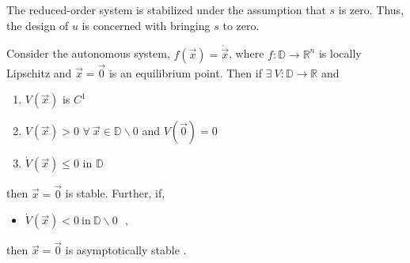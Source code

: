The reduced-order system is stabilized under the assumption that $s$ is zero. Thus, the design of $u$ is concerned with bringing $s$ to zero.
\begin{theorem}
  \label{th:lyapunovStabilityTheorem}
  Consider the autonomous system, $f(\vec{x}) = \dot{\vec{x}}$, where $f : \mathbb{D} \rightarrow \mathbb{R} ^n$ is locally Lipschitz and $\vec{x}=\vec{0}$ is an equilibrium point. Then if $\exists\ V : \mathbb{D} \rightarrow \mathbb{R}$ and \vspace{-12pt}
  \begin{enumerate}
    \item $V(\vec{x})$ is $C^1$
    \item $V(\vec{x}) > 0$ $\forall\ \vec{x} \in \mathbb{D}\backslash 0$ and $V(\vec{0}) = 0$
    \item $\dot{V}(\vec{x}) \leq 0$ in $\mathbb{D}$
  \end{enumerate} \vspace{-12pt}
  then $\vec{x} = \vec{0}$ is stable. Further, if,
  \vspace{-12pt}
  \begin{itemize}
    \item[] $ \dot{V}(\vec{x}) < 0\ \mathrm{in}\ \mathbb{D}\backslash 0  \ \ \ ,  $
  \end{itemize}\vspace{-12pt}
  then $\vec{x} = \vec{0}$ is asymptotically stable \cite{HKKhalil}.
\end{theorem}\vspace{-12pt}

